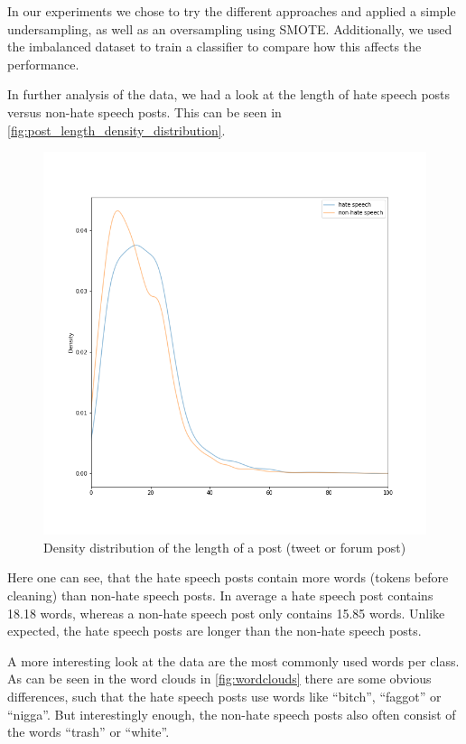 In our experiments we chose to try the different approaches and applied a simple undersampling, as well as an oversampling using SMOTE. Additionally, we used the imbalanced dataset to train a classifier to compare how this affects the performance.

\vspace{1cm}

In further analysis of the data, we had a look at the length of hate speech posts versus non-hate speech posts. This can be seen in \autoref{fig:post_length_density_distribution}.

\begin{figure}[ht]
    \centering
    \includegraphics[width=0.8\linewidth]{figures/post_length_density_distribution.png}
    \caption{Density distribution of the length of a post (tweet or forum post)}
    \label{fig:post_length_density_distribution}
\end{figure}

Here one can see, that the hate speech posts contain more words (tokens before cleaning) than non-hate speech posts. In average a hate speech post contains 18.18 words, whereas a non-hate speech post only contains 15.85 words. Unlike expected, the hate speech posts are longer than the non-hate speech posts.

A more interesting look at the data are the most commonly used words per class. As can be seen in the word clouds in \autoref{fig:wordclouds} there are some obvious differences, such that the hate speech posts use words like \enquote{bitch}, \enquote{faggot} or \enquote{nigga}. But interestingly enough, the non-hate speech posts also often consist of the words \enquote{trash} or \enquote{white}.

